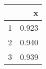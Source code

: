 \begin{table}[ht]
\centering
\begin{tabular}{rr}
  \hline
 & x \\ 
  \hline
1 & 0.923 \\ 
  2 & 0.940 \\ 
  3 & 0.939 \\ 
   \hline
\end{tabular}
\end{table}
